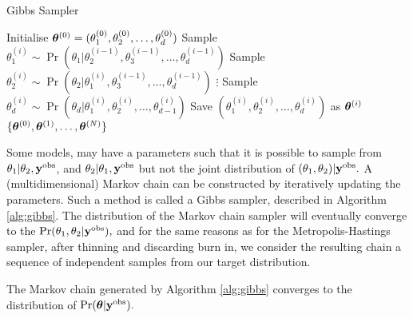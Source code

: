 \begin{algorithm}[htbp]
    \caption{Gibbs Sampler}
    \label{alg:gibbs}
    \begin{algorithmic}
        \State Initialise
        $\bm{\theta}^{(0)} = (\theta_1^{(0)}, \theta_2^{(0)}, \dots, \theta_d^{(0)})$
        \State Sample
        $\theta_1^{(i)}
            \sim \Pr(
            \theta_1
            | \theta_2^{(i-1)}, \theta_3^{(i-1)}, \dots, \theta_d^{(i-1)}
            )$
        \State Sample
        $\theta_2^{(i)}
            \sim \Pr(
            \theta_2
            | \theta_1^{(i)}, \theta_3^{(i-1)}, \dots, \theta_d^{(i-1)})$
        \State $\vdots$
        \State Sample
        $\theta_d^{(i)}
            \sim \Pr(
            \theta_d
            | \theta_1^{(i)}, \theta_2^{(i)}, \dots, \theta_{d-1}^{(i)})$
        \State Save $(\theta_1^{(i)}, \theta_2^{(i)}, \dots, \theta_d^{(i)})$
        as $\bm{\theta}^{(i)}$
        \EndFor
        \State \Return $\{\bm{\theta}^{(0)}, \bm{\theta}^{(1)}, \dots, \bm{\theta}^{(N)}\}$
    \end{algorithmic}
\end{algorithm}

Some models, may have a parameters such that it is possible
to sample from $\theta_1 | \theta_2, \mathbf{y}^{\mathrm{obs}}$, and
$\theta_2 | \theta_1, \mathbf{y}^{\mathrm{obs}}$ but not the joint distribution of
$(\theta_1, \theta_2)| \mathbf{y}^{\mathrm{obs}}.$ A (multidimensional) Markov chain can be
constructed by iteratively updating the parameters. Such a method is called
a Gibbs sampler, described in
Algorithm \ref{alg:gibbs}. The distribution of the Markov chain
sampler will eventually converge to the
$\Pr(\theta_1, \theta_2 | \mathbf{y}^{\mathrm{obs}}),$ and for the same reasons as for
the Metropolis-Hastings
sampler, after thinning and discarding burn in, we consider the resulting
chain a sequence of independent samples from our target distribution.

\begin{theorem}
    The Markov chain generated by Algorithm \ref{alg:gibbs}
    converges to the distribution of $\Pr(\bm{\theta}|\mathbf{y}^{\mathrm{obs}}).$
\end{theorem}

